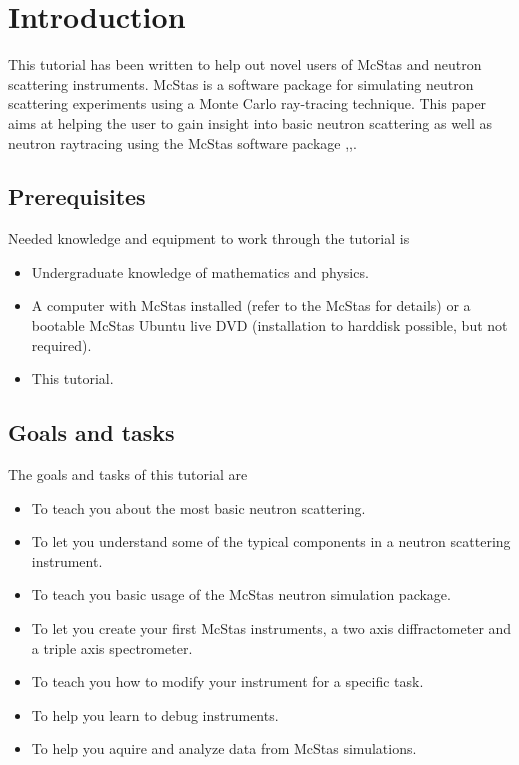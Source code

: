 \section{Introduction}
This tutorial has been written to help out novel users of McStas and neutron
scattering instruments. McStas is a software package for simulating
neutron scattering experiments using a Monte Carlo ray-tracing technique. This paper 
aims at helping the user to gain insight into basic neutron scattering 
as well as neutron raytracing using the McStas software package
\cite{McStas0},\cite{Manual},\cite{Websites}.
\subsection{Prerequisites}
Needed knowledge and equipment to work through the tutorial is
\begin{itemize}
\item{Undergraduate knowledge of mathematics and physics.}
\item{A computer with McStas installed (refer to the McStas
    \cite{Websites} for details) or a bootable McStas Ubuntu live DVD
    (installation to harddisk possible, but not required).}
\item{This tutorial.}
\end{itemize}
\subsection{Goals and tasks}
The goals and tasks of this tutorial are
\begin{itemize}
\item{To teach you about the most basic neutron scattering.}
\item{To let you understand some of the typical components in a
    neutron scattering instrument.}
\item{To teach you basic usage of the McStas neutron simulation
    package.}
\item{To let you create your first McStas instruments, a two axis diffractometer and a triple axis spectrometer.}
\item{To teach you how to modify your instrument for a specific task.}
\item{To help you learn to debug instruments.}
\item{To help you aquire and analyze data from McStas simulations.}
\end{itemize}
